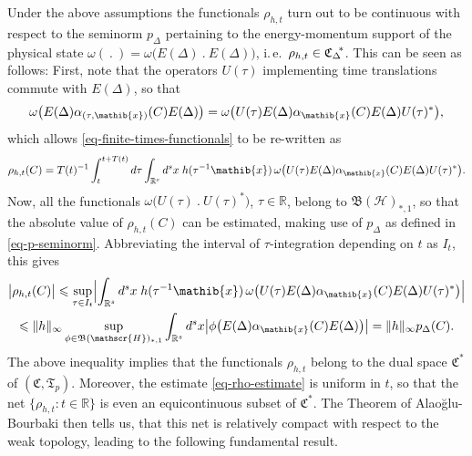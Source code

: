 \documentclass[11pt,twoside,openright]{report}
\theoremstyle{definition}
\theoremstyle{plain}
\theoremstyle{remark}
\theoremstyle{assumption}
\newcommand{\bset}[1]{\bigl\{ #1 \bigr\}}
\newcommand{\babs}[1]{\bigl\lvert #1 \bigr\rvert}
\newcommand{\Babs}[1]{\Bigl\lvert #1 \Bigr\rvert}
\newcommand{\norm}[1]{\lVert #1 \rVert}
\newcommand{\pD}{p_\Delta}
\newcommand{\pDx}[1]{p_\Delta ( #1 )}
\newcommand{\Rbb}{\mathbb{R}}
\newcommand{\Cfrak}{\mathfrak{C}}
\newcommand{\Tfrak}{\mathfrak{T}}
\newcommand{\xib}{\mathib{x}}
\newcommand{\Rs}{\mathbb{R}^s}
\newcommand{\BH}{\mathfrak{B} ( \mathscr{H} )}
\newcommand{\ED}{E ( \Delta )}
\newcommand{\Cstar}{\mathfrak{C}^*}
\newcommand{\CDstar}{{\mathfrak{C}_\Delta}^{\negthickspace *}}
\newcommand{\aibx}{\alpha_\mathib{x}}
\begin{document}
Under the above assumptions the functionals $\rho_{h , t}$ turn out to
be continuous with respect to the seminorm $\pD$ pertaining to the
energy-momentum support of the physical state $\omega (~.~)= \omega
\bigl( \ED~.~\ED \bigr)$, i.\,e.~$\rho_{h , t} \in \CDstar$. This can
be seen as follows: First, note that the operators $U ( \tau )$
implementing time translations commute with $\ED$, so that
\begin{equation*}
  \omega \bigl( \ED \alpha_{( \tau , \xib )} ( C ) \ED \bigr) = \omega
  \bigl( U ( \tau ) \ED \aibx ( C ) \ED U ( \tau )^* \bigr) \text{,}
\end{equation*}
which allows \eqref{eq-finite-times-functionals} to be re-written as
\begin{equation}
  \label{eq-rho-alt-form}
  \rho_{h , t} ( C ) = T ( t )^{-1} \int_t^{t + T ( t )} d \tau
  \int_{\Rs} d^s x \; h ( \tau^{-1} \xib ) \, \omega \bigl( U ( \tau )
  \ED \aibx ( C ) \ED U ( \tau )^* \bigr) \text{.}
\end{equation}
Now, all the functionals $\omega \bigl( U ( \tau )~.~U ( \tau )^*
\bigr)$, $\tau \in \Rbb$, belong to $\BH_{*,1}$, so that the absolute
value of $\rho_{h , t} ( C )$ can be estimated, making use of $\pD$ as
defined in \eqref{eq-p-seminorm}. Abbreviating the interval of
$\tau$-integration depending on $t$ as $I_t$, this gives
\begin{multline}
  \label{eq-rho-estimate}
  \babs{\rho_{h , t} ( C )} \leqslant \sup_{\tau \in I_t} \Babs{
  \int_{\Rs} d^s x \; h ( \tau^{-1} \xib ) \, \omega \bigl( U ( \tau )
  \ED \aibx ( C ) \ED U ( \tau )^* \bigr)} \\
  \leqslant \norm{h}_\infty \sup_{\phi \in \BH_{*,1}} \int_{\Rs} d^s x
  \babs{\phi \bigl( \ED \aibx ( C ) \ED \bigr)} = \norm{h}_\infty
  \pDx{C} \text{.}
\end{multline}
The above inequality implies that  the functionals $\rho_{h , t}$
belong to the dual space $\Cstar$ of $( \Cfrak , \Tfrak_p
)$. Moreover, the estimate \eqref{eq-rho-estimate} is uniform in $t$,
so that the net $\bset{\rho_{h , t} : t \in \Rbb}$ is even an
equicontinuous subset of $\Cstar$. The Theorem of Alao\u{g}lu-Bourbaki
\cite[Theorem~8.5.2]{jarchow:1981} then tells us, that this net is
relatively compact with respect to the weak topology, leading to the
following fundamental result.
\end{document}
